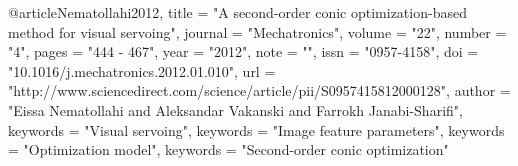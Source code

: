 @article{Nematollahi2012,
title = "A second-order conic optimization-based method for visual servoing",
journal = "Mechatronics",
volume = "22",
number = "4",
pages = "444 - 467",
year = "2012",
note = "",
issn = "0957-4158",
doi = "10.1016/j.mechatronics.2012.01.010",
url = "http://www.sciencedirect.com/science/article/pii/S0957415812000128",
author = "Eissa Nematollahi and Aleksandar Vakanski and Farrokh Janabi-Sharifi",
keywords = "Visual servoing",
keywords = "Image feature parameters",
keywords = "Optimization model",
keywords = "Second-order conic optimization"
}

